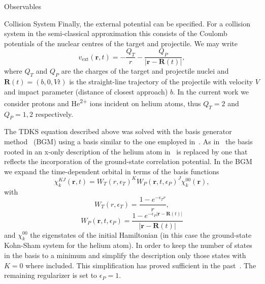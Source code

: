 \documentclass[letterpaper, 11 pt]{report}
\begin{document}
\begin{chapter}{Observables \label{chap:p-he2p-he}}
\begin{section}{Collision System \label{sec:p-he2p-he-sys}}
      Finally, the external potential can be specified. For a collision system in the semi-classical
      approximation this consists of the Coulomb potentials of the nuclear centres of the target and
      projectile. We may write
      \begin{equation} \label{eq:phe2p-ext}
         v_\mathrm{ext}(\mathbf{r},t) = -\frac{Q_T}{r} 
         - \frac{Q_P}{\left| \mathbf{r} - \mathbf{R}(t) \right|},
      \end{equation}
      where $Q_T$ and $Q_P$ are the charges of the target and projectile nuclei and
      $\mathbf{R}(t) = (b,0,V t)$ is the straight-line trajectory of the projectile with velocity $V$ and
      impact parameter (distance of closest approach) $b$. In the current work we consider protons and
      He\textsuperscript{2+} ions incident on helium atoms, thus $Q_T = 2$ and $Q_P = 1,2$ respectively.

      The TDKS equation described above was solved with the basis generator method~\cite{bgm} (BGM)
      using a basis similar to the one employed in~\cite{keim-ihe}. As in~\cite{pbarhe} the basis rooted
      in an x-only description of the helium atom in~\cite{keim-ihe} is replaced by one that reflects the
      incorporation of the ground-state correlation potential. In the BGM we expand the time-dependent
      orbital in terms of the basis functions
      \begin{equation}
         \chi^{KJ}_k (\mathbf{r},t)
         = W_T(r,\epsilon_T)^K W_P( \mathbf{r},t, \epsilon_P)^J \chi^{00}_k (\mathbf{r}),
      \end{equation}
      with
      \begin{equation}
         W_T(r,\epsilon_T) = \frac{1 - e^{-\epsilon_T r}}{r},
      \end{equation}
      \begin{equation}
         W_P (\mathbf{r},t,\epsilon_P)
         = \frac{1 - e^{-\epsilon_P|\mathbf{r} - \mathbf{R}(t)|}}{|\mathbf{r} - \mathbf{R}(t)|}
      \end{equation}
      and $\chi^{00}_k$ the eigenstates of the initial Hamiltonian (in this case the ground-state
      Kohn-Sham system for the helium atom). In order to keep the number of states in the basis to a
      minimum and simplify the description only those states with $K = 0$ where included. This
      simplification has proved sufficient in the past~\cite{bgm-rev}. The remaining regularizer is set
      to $\epsilon_P = 1$.


\end{section}
\end{chapter}
\end{document}

